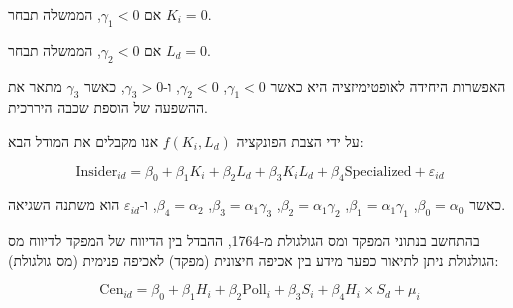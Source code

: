אם \(\gamma_1 < 0\), הממשלה תבחר \(K_i = 0\).

אם \(\gamma_2 < 0\), הממשלה תבחר \(L_d = 0\).

האפשרות היחידה לאופטימיזציה היא כאשר \(\gamma_1 < 0\), \(\gamma_2 < 0\), ו-\(\gamma_3 > 0\), כאשר \(\gamma_3\) מתאר את ההשפעה של הוספת שכבה היררכית.


על ידי הצבת הפונקציה \(f(K_i, L_d)\) אנו מקבלים את המודל הבא:

\begin{equation}
    \text{Insider}_{id} = \beta_0 + \beta_1 K_i + \beta_2 L_d + \beta_3 K_i L_d + \beta_4 \text{Specialized} + \varepsilon_{id}
\end{equation}

כאשר \(\beta_0 = \alpha_0\), \(\beta_1 = \alpha_1 \gamma_1\), \(\beta_2 = \alpha_1 \gamma_2\), \(\beta_3 = \alpha_1 \gamma_3\), \(\beta_4 = \alpha_2\), ו-\(\varepsilon_{id}\) הוא משתנה השגיאה.

בהתחשב בנתוני המפקד ומס הגולגולת מ-1764, ההבדל בין הדיווח של המפקד לדיווח מס הגולגולת ניתן לתיאור כפער מידע בין אכיפה חיצונית (מפקד) לאכיפה פנימית (מס גולגולת):

\begin{equation}
    \text{Cen}_{id} = \beta_0 + \beta_1 H_i + \beta_2 \text{Poll}_i + \beta_3 S_i + \beta_4 H_i \times S_d + \mu_i
\end{equation}
